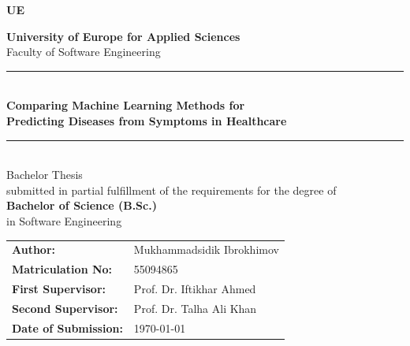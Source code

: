 \begin{titlepage}
    \noindent
    \begin{minipage}{\textwidth}
        \colorbox{UERed}{%
            \begin{minipage}{\dimexpr\textwidth-2\fboxsep}
                \vspace{0.5cm}
                \centering
                {\color{white}\fontsize{40}{48}\selectfont\textbf{UE}}
                \vspace{0.3cm}
            \end{minipage}%
        }
    \end{minipage}

    \vspace{1.0cm}

    \centering

    {\large\color{UEDoveBlue}\textbf{University of Europe for Applied Sciences}}\\[0.3cm]
    {\large\color{UEGrey}Faculty of Software Engineering}\\[0.5cm]

    {\color{UERed}\rule{0.7\textwidth}{2pt}}\\[1.5cm]

    {\LARGE\bfseries Comparing Machine Learning Methods for\\ Predicting Diseases from Symptoms in Healthcare}\\[1.5cm]

    {\color{UERed}\rule{0.5\textwidth}{1pt}}\\[1cm]

    {\large Bachelor Thesis}\\[0.4cm]
    {\normalsize submitted in partial fulfillment of the requirements for the degree of}\\[0.4cm]
    {\large\bfseries Bachelor of Science (B.Sc.)}\\[0.3cm]
    {\normalsize in Software Engineering}\\[1.5cm]

    \begin{flushleft}
        \hspace{3cm}
        \begin{tabular}{@{}ll}
            \textbf{Author:}             & Mukhammadsidik Ibrokhimov \\[0.3cm]
            \textbf{Matriculation No:}   & 55094865 \\[0.3cm]
            \textbf{First Supervisor:}   & Prof. Dr. Iftikhar Ahmed \\[0.3cm]
            \textbf{Second Supervisor:}  & Prof. Dr. Talha Ali Khan \\[0.3cm]
            \textbf{Date of Submission:} & \today \\
        \end{tabular}
    \end{flushleft}


\end{titlepage}
